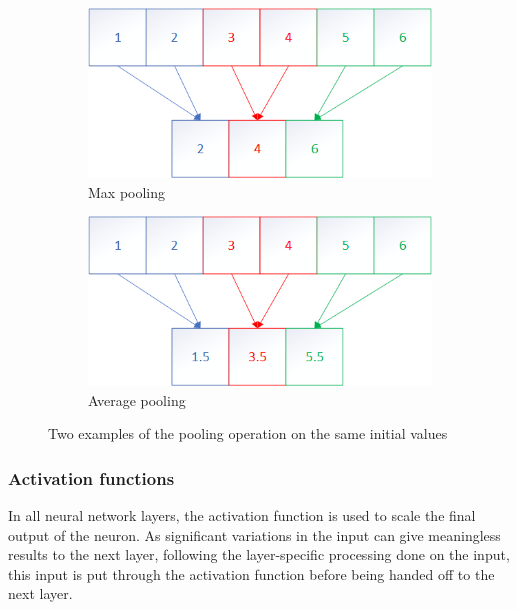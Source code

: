 \begin{figure}
    \centering
    \begin{subfigure}[b]{.49\textwidth}
        \centering
        \includegraphics[width=\textwidth]{figures/maxpooling.png}
        \caption{Max pooling}
        \label{sfig:maxpoolexample}
    \end{subfigure}
    \hfill
    \begin{subfigure}[b]{.49\textwidth}
        \centering
        \includegraphics[width=\textwidth]{figures/avgpooling.png}
        \caption{Average pooling}
        \label{sfig:avgpoolexample}
    \end{subfigure}
    \caption{Two examples of the pooling operation on the same initial values}
    \label{fig:poolexample}
\end{figure}

\subsubsection{Activation functions}
In all neural network layers, the activation function is used to scale the final output of the neuron.
As significant variations in the input can give meaningless results to the next layer, following the layer-specific processing done on the input, this input is put through the activation function before being handed off to the next layer.

